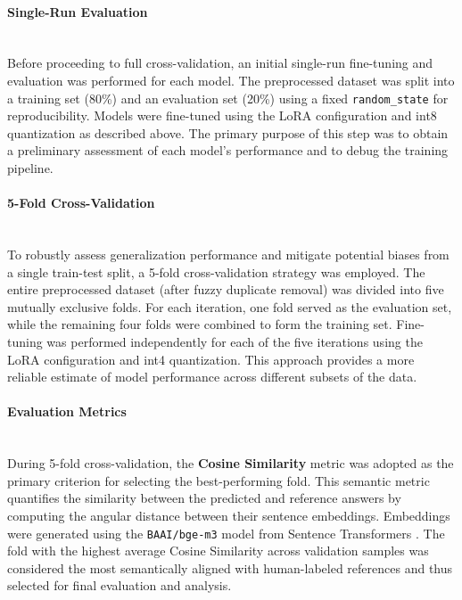 \documentclass[runningheads]{llncs}
\begin{document}
\paragraph{Single-Run Evaluation}\mbox{}\\
\label{sec:single_run_eval}Before proceeding to full cross-validation, an initial single-run fine-tuning and evaluation was performed for each model. The preprocessed dataset was split into a training set (80\%) and an evaluation set (20\%) using a fixed \texttt{random\_state} for reproducibility. Models were fine-tuned using the LoRA configuration and int8 quantization as described above. The primary purpose of this step was to obtain a preliminary assessment of each model's performance and to debug the training pipeline.

\paragraph{5-Fold Cross-Validation}\mbox{}\\
\label{sec:cross_validation_eval}To robustly assess generalization performance and mitigate potential biases from a single train-test split, a 5-fold cross-validation strategy was employed. The entire preprocessed dataset (after fuzzy duplicate removal) was divided into five mutually exclusive folds. For each iteration, one fold served as the evaluation set, while the remaining four folds were combined to form the training set. Fine-tuning was performed independently for each of the five iterations using the LoRA configuration and int4 quantization. This approach provides a more reliable estimate of model performance across different subsets of the data.

\paragraph{Evaluation Metrics}\mbox{}\\
During 5-fold cross-validation, the \textbf{Cosine Similarity} metric was adopted as the primary criterion for selecting the best-performing fold. This semantic metric quantifies the similarity between the predicted and reference answers by computing the angular distance between their sentence embeddings. Embeddings were generated using the \texttt{BAAI/bge-m3} model from Sentence Transformers \cite{b10}. The fold with the highest average Cosine Similarity across validation samples was considered the most semantically aligned with human-labeled references and thus selected for final evaluation and analysis.
\end{document}
